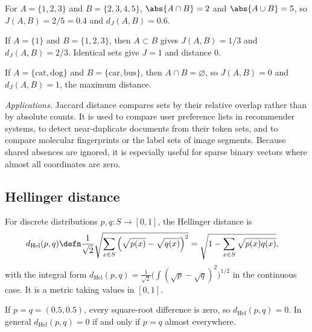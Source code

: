 \documentclass[a4paper, 12pt]{book}
\begin{document}
\begin{example}
    For $A=\{1,2,3\}$ and $B=\{2,3,4,5\}$, $\abs{A\cap B}=2$ and $\abs{A\cup B}=5$, so $J(A,B)=2/5=0.4$ and $d_J(A,B)=0.6$.
\end{example}

\begin{example}
    If $A=\{1\}$ and $B=\{1,2,3\}$, then $A\subset B$ gives $J(A,B)=1/3$ and $d_J(A,B)=2/3$. Identical sets give $J=1$ and distance $0$.
\end{example}

\begin{example}
    If $A=\{\text{cat},\text{dog}\}$ and $B=\{\text{car},\text{bus}\}$, then $A\cap B=\varnothing$, so $J(A,B)=0$ and $d_J(A,B)=1$, the maximum distance.
\end{example}

\emph{Applications.} Jaccard distance compares sets by their relative overlap rather than by absolute counts. It is used to compare user preference lists in recommender systems, to detect near-duplicate documents from their token sets, and to compare molecular fingerprints or the label sets of image segments. Because shared absences are ignored, it is especially useful for sparse binary vectors where almost all coordinates are zero.

\subsection{Hellinger distance}
\begin{definition}
    For discrete distributions $p,q: S \longrightarrow [0,1]$, the Hellinger distance is
    \begin{align}
        d_{\mathrm{Hel}}(p,q) &\defn \frac{1}{\sqrt{2}}
        \sqrt{\sum_{x \in S} \left(\sqrt{p(x)}-\sqrt{q(x)}\right)^2}
        = \sqrt{1-\sum_{x \in S}\sqrt{p(x) q(x)}},
    \end{align}
     with the integral form $d_{\mathrm{Hel}}(p,q)=\frac{1}{\sqrt2}\big(\int(\sqrt p-\sqrt q)^2\big)^{1/2}$
    in the continuous case. It is a metric taking values in $[0,1]$.
\end{definition}

\begin{example}
    If $p=q=(0.5,0.5)$, every square-root difference is zero, so $d_{\mathrm{Hel}}(p,q)=0$. In general $d_{\mathrm{Hel}}(p,q)=0$ if and only if $p=q$ almost everywhere.
\end{example}
\end{document}
